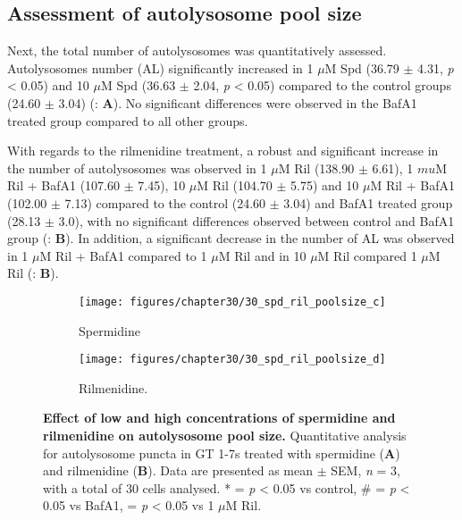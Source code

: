 {\subsection{Assessment of autolysosome pool size}
Next, the total number of autolysosomes was quantitatively assessed.  Autolysosomes number (AL) significantly increased in 1 $\mu$M Spd (36.79 $\pm$ 4.31, \textit{p} < 0.05) and 10 $\mu$M Spd (36.63 $\pm$ 2.04, \textit{p} < 0.05) compared to the control groups (24.60 $\pm$ 3.04) (: \textbf{A}). No significant differences were observed in the BafA1 treated group compared to all other groups.

With regards to the rilmenidine treatment, a robust and significant increase in the number of autolysosomes was observed in 1 $\mu$M Ril (138.90 $\pm$ 6.61), 1 $mu$M Ril + BafA1 (107.60 $\pm$ 7.45), 10 $\mu$M Ril (104.70 $\pm$ 5.75) and 10 $\mu$M Ril + BafA1 (102.00 $\pm$ 7.13) compared to the control (24.60 $\pm$ 3.04) and BafA1 treated group (28.13 $\pm$ 3.0), with no significant differences observed between control and BafA1 group (: \textbf{B}). In addition, a significant decrease in the number of AL was observed in 1 $\mu$M Ril + BafA1 compared to 1 $\mu$M Ril and in 10 $\mu$M Ril compared 1 $\mu$M Ril (: \textbf{B}).

\begin{figure}[!htbp]
  \begin{subfigure}[b]{0.495\linewidth}
    \texttt{[image: figures/chapter30/30\_spd\_ril\_poolsize\_c]}
    \caption{Spermidine}
  \end{subfigure}
  \begin{subfigure}[b]{0.495\linewidth}
    \texttt{[image: figures/chapter30/30\_spd\_ril\_poolsize\_d]}
    \caption{Rilmenidine.}
  \end{subfigure}
  \caption[Effect of low and high concentrations of spermidine and rilmenidine on autolysosome pool size]{\textbf{Effect of low and high concentrations of spermidine and rilmenidine on autolysosome pool size.} Quantitative analysis for autolysosome puncta in GT 1-7s treated with spermidine (\textbf{A}) and rilmenidine (\textbf{B}). Data are presented as mean $\pm$ SEM, \textit{n} = 3, with a total of 30 cells analysed. * = \textit{p} < 0.05 vs control, \# = \textit{p} < 0.05 vs BafA1, \@ = \textit{p} < 0.05 vs 1 $\mu$M Ril.}
  \label{fig:30_spd_ril_poolsize2}
\end{figure}

}
